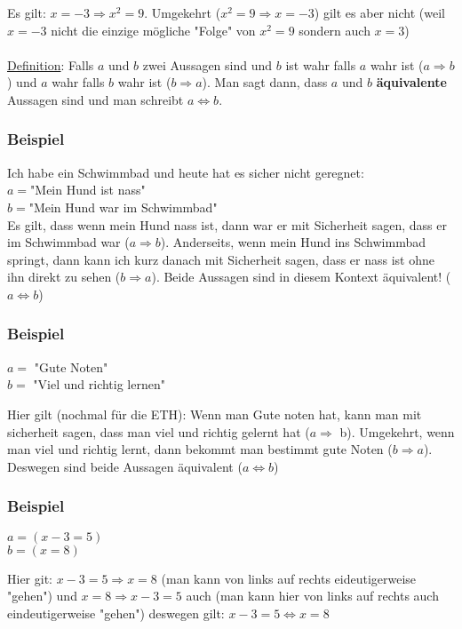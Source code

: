 \documentclass[11pt]{article} %
\begin{document}
Es gilt: $x  = -3 \Rightarrow x^2 = 9$. Umgekehrt ($x^2=9 \Rightarrow  x = -3$) gilt es aber nicht (weil $x=-3$ nicht die einzige mögliche "Folge" von $x^2=9$ sondern auch $x=3$)\\\\


\underline{Definition}: Falls $a$ und $b$ zwei Aussagen sind und $b$ ist wahr falls $a$ wahr ist ($a \Rightarrow b$) und $a$ wahr falls $b$ wahr ist ($b \Rightarrow a$). Man sagt dann, dass $a$ und $b$ {\bf äquivalente} Aussagen sind und man schreibt $a \Leftrightarrow b$.

\subsubsection{Beispiel}
Ich habe ein Schwimmbad und heute hat es sicher nicht geregnet:\\
$a=$"Mein Hund ist nass"\\
$b=$"Mein Hund war im Schwimmbad"\\ 

Es gilt, dass wenn mein Hund nass ist, dann war er mit Sicherheit sagen, dass er im Schwimmbad war ($a \Rightarrow b$). Anderseits, wenn mein Hund ins Schwimmbad springt, dann kann ich kurz danach mit Sicherheit sagen, dass er nass ist ohne ihn direkt zu sehen ($b \Rightarrow a$). Beide Aussagen sind in diesem Kontext äquivalent! ($a \Leftrightarrow b$)

\subsubsection{Beispiel}

$a=$ "Gute Noten"\\
$b=$ "Viel und richtig lernen"

Hier gilt (nochmal für die ETH): Wenn man Gute noten hat, kann man mit sicherheit sagen, dass man viel und richtig gelernt hat ($a \Rightarrow$ b). Umgekehrt, wenn man viel und richtig lernt, dann bekommt man bestimmt gute Noten ($b \Rightarrow a$). Deswegen sind beide Aussagen äquivalent ($a \Leftrightarrow b$)

\subsubsection{Beispiel}

$a = (x -3 = 5)$\\
$b = (x = 8)$

Hier git: $x-3=5 \Rightarrow x=8$ (man kann von links auf rechts eideutigerweise "gehen") und $x=8 \Rightarrow x-3=5$ auch (man kann hier von links auf rechts auch eindeutigerweise "gehen") deswegen gilt: $x-3 = 5 \Leftrightarrow x=8$
\end{document}

